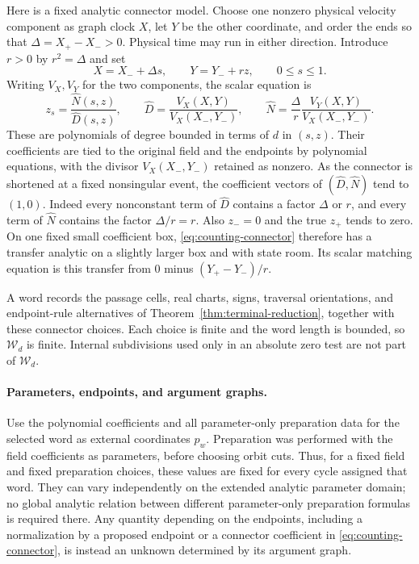 Here is a fixed analytic connector model.  Choose one nonzero physical
velocity component as graph clock $X$, let $Y$ be the other coordinate,
and order the ends so that $\Delta=X_+-X_->0$.  Physical time may run
in either direction.  Introduce $r>0$ by $r^2=\Delta$ and set
\[
 X=X_-+\Delta s,\qquad Y=Y_-+rz,\qquad 0\le s\le1.
\]
Writing $V_X,V_Y$ for the two components, the scalar equation is
\begin{equation}\label{eq:counting-connector}
 z_s=\frac{\widehat N(s,z)}{\widehat D(s,z)},\qquad
 \widehat D=\frac{V_X(X,Y)}{V_X(X_-,Y_-)},\qquad
 \widehat N=\frac{\Delta}{r}
              \frac{V_Y(X,Y)}{V_X(X_-,Y_-)}.
\end{equation}
These are polynomials of degree bounded in terms of $d$ in $(s,z)$.
Their coefficients are tied to the original field and the endpoints
by polynomial equations, with the divisor $V_X(X_-,Y_-)$ retained
as nonzero.  As the connector is shortened at a fixed nonsingular
event, the coefficient vectors of $(\widehat D,\widehat N)$ tend to
$(1,0)$.  Indeed every nonconstant term of $\widehat D$ contains a
factor $\Delta$ or $r$, and every term of $\widehat N$ contains the
factor $\Delta/r=r$.  Also $z_-=0$ and the true $z_+$ tends to zero.
On one fixed small coefficient box, \eqref{eq:counting-connector}
therefore has a transfer analytic on a slightly larger box and with
state room.  Its scalar matching equation is this transfer from $0$
minus $(Y_+-Y_-)/r$.

A word records the passage cells, real charts, signs, traversal
orientations, and endpoint-rule alternatives of
Theorem~\ref{thm:terminal-reduction}, together with these connector
choices.  Each choice is finite and the word length is bounded, so
$\mathcal W_d$ is finite.  Internal subdivisions used only in an
absolute zero test are not part of $\mathcal W_d$.

\paragraph{Parameters, endpoints, and argument graphs.}
Use the polynomial coefficients and all parameter-only preparation
data for the selected word as external coordinates $p_w$.  Preparation
was performed with the field coefficients as parameters, before
choosing orbit cuts.  Thus, for a fixed field and fixed preparation
choices, these values are fixed for every cycle assigned that word.
They can vary independently on the extended analytic parameter
domain; no global analytic relation between different parameter-only
preparation formulas is required there.  Any quantity depending on
the endpoints, including a normalization by a proposed endpoint or a
connector coefficient in \eqref{eq:counting-connector}, is instead an
unknown determined by its argument graph.

